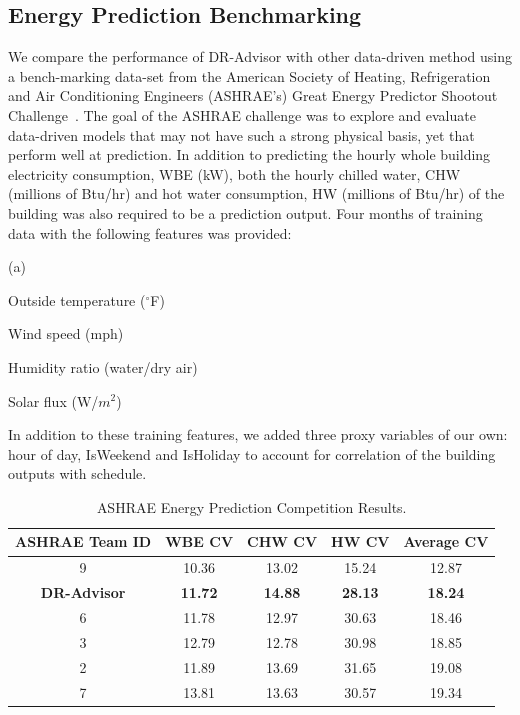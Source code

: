 \subsection{Energy Prediction Benchmarking}
\label{sec:ashrae}
We compare the performance of DR-Advisor with other data-driven method using a bench-marking data-set from the American Society of Heating, Refrigeration and Air Conditioning Engineers (ASHRAE's) Great Energy Predictor Shootout Challenge~\cite{kreider1994predicting}. 
The goal of the ASHRAE challenge  was to explore and evaluate data-driven models that may not have such a strong physical basis, yet that perform well at prediction.
In addition to predicting the hourly whole building electricity consumption, WBE (kW), both the hourly chilled water, CHW (millions of Btu/hr) and hot water consumption, HW (millions of Btu/hr) of the building was also required to be a prediction output. Four months of training data with the following features was provided: 
\begin{inparaenum}(a)
\item Outside temperature ($^\circ$F)
\item Wind speed (mph)
\item Humidity ratio (water/dry air)
\item Solar flux (W/$m^2$)
\end{inparaenum}
In addition to these training features, we added three proxy variables of our own: hour of day, IsWeekend and IsHoliday to account for correlation of the building outputs with schedule. 

\begin{table}[b!]
\centering
\caption{ASHRAE Energy Prediction Competition Results.}
    \begin{tabular}{c|c|c|c|c}
    \toprule
    ASHRAE Team ID & WBE CV & CHW CV & HW CV & Average CV \\
    \midrule
    9              & 10.36  & 13.02  & 15.24 & 12.87      \\
    \textbf{DR-Advisor} & \textbf{11.72}  & \textbf{14.88}  & \textbf{28.13} & \textbf{18.24}     \\
    6              & 11.78  & 12.97  & 30.63 & 18.46      \\ 
    3              & 12.79  & 12.78  & 30.98 & 18.85      \\
    2              & 11.89  & 13.69  & 31.65 & 19.08      \\
    7              & 13.81  & 13.63  & 30.57 & 19.34      \\
    \bottomrule
    \end{tabular}
    \label{tab:results}
\end{table}

